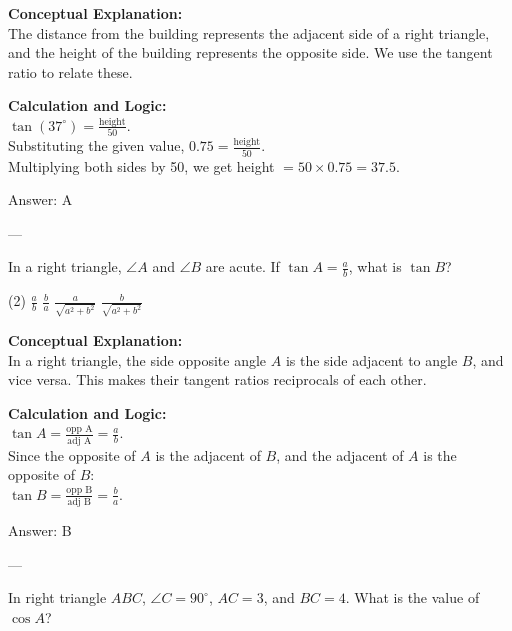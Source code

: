 \documentclass[11pt,paper=a4,answers]{exam}
\begin{document}
\begin{questions}
\begin{solution}
\textbf{Conceptual Explanation:} \\
The distance from the building represents the adjacent side of a right triangle, and the height of the building represents the opposite side. We use the tangent ratio to relate these.

\vspace{10pt}
\textbf{Calculation and Logic:} \\
$\tan(37^\circ) = \frac{\text{height}}{50}$. \\
Substituting the given value, $0.75 = \frac{\text{height}}{50}$. \\
Multiplying both sides by 50, we get height $= 50 \times 0.75 = 37.5$.

\vspace{15pt}
Answer: \colorbox{yellow!100}{A}
\end{solution}

---

\question
In a right triangle, $\angle A$ and $\angle B$ are acute. If $\tan A = \frac{a}{b}$, what is $\tan B$?
\begin{tasks}(2)
    \task $\frac{a}{b}$
    \task $\frac{b}{a}$
    \task $\frac{a}{\sqrt{a^2+b^2}}$
    \task $\frac{b}{\sqrt{a^2+b^2}}$
\end{tasks}

\begin{solution}
\textbf{Conceptual Explanation:} \\
In a right triangle, the side opposite angle $A$ is the side adjacent to angle $B$, and vice versa. This makes their tangent ratios reciprocals of each other.

\vspace{10pt}
\textbf{Calculation and Logic:} \\
$\tan A = \frac{\text{opp A}}{\text{adj A}} = \frac{a}{b}$. \\
Since the opposite of $A$ is the adjacent of $B$, and the adjacent of $A$ is the opposite of $B$: \\
$\tan B = \frac{\text{opp B}}{\text{adj B}} = \frac{b}{a}$.

\vspace{15pt}
Answer: \colorbox{yellow!100}{B}
\end{solution}

---

\question
In right triangle $ABC$, $\angle C = 90^\circ$, $AC = 3$, and $BC = 4$. What is the value of $\cos A$?


\end{questions}
\end{document}
